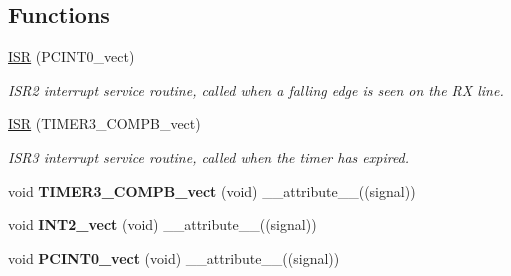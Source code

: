 \subsection*{Functions}
\begin{DoxyCompactItemize}
\item 
\hyperlink{group___engduino_i_r_gaa64c6dce15e9de9105b4ae9533c9a267}{I\+S\+R} (P\+C\+I\+N\+T0\+\_\+vect)
\begin{DoxyCompactList}\small\item\em I\+S\+R2 interrupt service routine, called when a falling edge is seen on the R\+X line. \end{DoxyCompactList}\item 
\hyperlink{group___engduino_i_r_ga31e211eaf3d75b51ddc639533541f25e}{I\+S\+R} (T\+I\+M\+E\+R3\+\_\+\+C\+O\+M\+P\+B\+\_\+vect)
\begin{DoxyCompactList}\small\item\em I\+S\+R3 interrupt service routine, called when the timer has expired. \end{DoxyCompactList}\item 
\hypertarget{group___engduino_i_r_ga1badf5d0acbb643f6bcf3deee4ffab13}{}void {\bfseries T\+I\+M\+E\+R3\+\_\+\+C\+O\+M\+P\+B\+\_\+vect} (void) \+\_\+\+\_\+attribute\+\_\+\+\_\+((signal))\label{group___engduino_i_r_ga1badf5d0acbb643f6bcf3deee4ffab13}

\item 
\hypertarget{group___engduino_i_r_ga69f6ac4d3bc5d08dc4a985794670478f}{}void {\bfseries I\+N\+T2\+\_\+vect} (void) \+\_\+\+\_\+attribute\+\_\+\+\_\+((signal))\label{group___engduino_i_r_ga69f6ac4d3bc5d08dc4a985794670478f}

\item 
\hypertarget{group___engduino_i_r_ga72338894182d59b1199d67dc13fbf68d}{}void {\bfseries P\+C\+I\+N\+T0\+\_\+vect} (void) \+\_\+\+\_\+attribute\+\_\+\+\_\+((signal))\label{group___engduino_i_r_ga72338894182d59b1199d67dc13fbf68d}


\end{DoxyCompactItemize}
